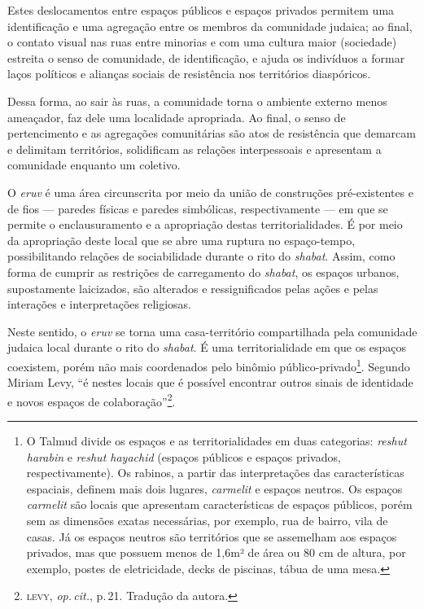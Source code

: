 Estes deslocamentos entre espaços públicos e espaços privados permitem
uma identificação e uma agregação entre os membros da comunidade
judaica; ao final, o contato visual nas ruas entre minorias e com uma
cultura maior (sociedade) estreita o senso de comunidade, de
identificação, e ajuda os indivíduos a formar laços políticos e alianças
sociais de resistência nos territórios diaspóricos.

Dessa forma, ao sair às ruas, a comunidade torna o ambiente externo
menos ameaçador, faz dele uma localidade apropriada. Ao final, o senso
de pertencimento e as agregações comunitárias são atos de resistência
que demarcam e delimitam territórios, solidificam as relações
interpessoais e apresentam a comunidade enquanto um coletivo.

\begin{center}\end{center}

\noindent{}O \emph{eruv} é uma área circunscrita por meio da união de construções
pré-existentes e de fios --- paredes físicas e paredes simbólicas,
respectivamente --- em que se permite o enclausuramento e a apropriação
destas territorialidades. É por meio da apropriação deste local que se
abre uma ruptura no espaço-tempo, possibilitando relações de
sociabilidade durante o rito do \emph{shabat}. Assim, como forma de
cumprir as restrições de carregamento do \emph{shabat}, os espaços
urbanos, supostamente laicizados, são alterados e ressignificados pelas
ações e pelas interações e interpretações religiosas.

Neste sentido, o \emph{eruv} se torna uma casa-território compartilhada
pela comunidade judaica local durante o rito do \emph{shabat}. É uma
territorialidade em que os espaços coexistem, porém não mais coordenados
pelo binômio público-privado\footnote{O Talmud divide os espaços
  e as territorialidades em duas categorias: \emph{reshut harabin} e
  \emph{reshut hayachid} (espaços públicos e espaços privados,
  respectivamente). Os rabinos, a partir das interpretações das
  características espaciais, definem mais dois lugares, \emph{carmelit}
  e espaços neutros. Os espaços \emph{carmelit} são locais que
  apresentam características de espaços públicos, porém sem as dimensões
  exatas necessárias, por exemplo, rua de bairro, vila de casas. Já os
  espaços neutros são territórios que se assemelham aos espaços
  privados, mas que possuem menos de 1,6m² de área ou 80 cm de altura,
  por exemplo, postes de eletricidade, decks de piscinas, tábua de uma
  mesa.}. Segundo Miriam Levy, ``é nestes locais que é possível
encontrar outros sinais de identidade e novos espaços de
colaboração''\footnote{\textsc{levy}, \emph{op.\,cit.}, p.\,21. Tradução da autora.}.

